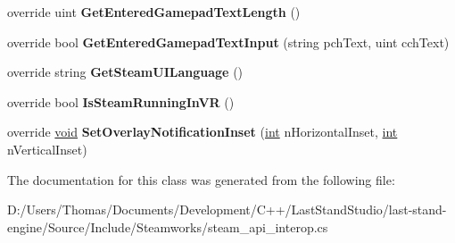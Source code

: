 \begin{DoxyCompactItemize}
\item 
\hypertarget{classValve_1_1Steamworks_1_1CSteamUtils_ab6822b494eec6c3917c4ce29c2763ef0}{}override uint {\bfseries Get\+Entered\+Gamepad\+Text\+Length} ()\label{classValve_1_1Steamworks_1_1CSteamUtils_ab6822b494eec6c3917c4ce29c2763ef0}

\item 
\hypertarget{classValve_1_1Steamworks_1_1CSteamUtils_aa99802aa51895b9343a1f068cb5695cb}{}override bool {\bfseries Get\+Entered\+Gamepad\+Text\+Input} (string pch\+Text, uint cch\+Text)\label{classValve_1_1Steamworks_1_1CSteamUtils_aa99802aa51895b9343a1f068cb5695cb}

\item 
\hypertarget{classValve_1_1Steamworks_1_1CSteamUtils_a2d7b8d89bb4150045d189a641a044fa5}{}override string {\bfseries Get\+Steam\+U\+I\+Language} ()\label{classValve_1_1Steamworks_1_1CSteamUtils_a2d7b8d89bb4150045d189a641a044fa5}

\item 
\hypertarget{classValve_1_1Steamworks_1_1CSteamUtils_a4b6487a9e80419629d25a6e880ebec4e}{}override bool {\bfseries Is\+Steam\+Running\+In\+V\+R} ()\label{classValve_1_1Steamworks_1_1CSteamUtils_a4b6487a9e80419629d25a6e880ebec4e}

\item 
\hypertarget{classValve_1_1Steamworks_1_1CSteamUtils_a67252ee53ad15ac69ad89dafbe1b7a2d}{}override \hyperlink{SDL__audio_8h_a52835ae37c4bb905b903cbaf5d04b05f}{void} {\bfseries Set\+Overlay\+Notification\+Inset} (\hyperlink{SDL__thread_8h_a6a64f9be4433e4de6e2f2f548cf3c08e}{int} n\+Horizontal\+Inset, \hyperlink{SDL__thread_8h_a6a64f9be4433e4de6e2f2f548cf3c08e}{int} n\+Vertical\+Inset)\label{classValve_1_1Steamworks_1_1CSteamUtils_a67252ee53ad15ac69ad89dafbe1b7a2d}

\end{DoxyCompactItemize}


The documentation for this class was generated from the following file\+:\begin{DoxyCompactItemize}
\item 
D\+:/\+Users/\+Thomas/\+Documents/\+Development/\+C++/\+Last\+Stand\+Studio/last-\/stand-\/engine/\+Source/\+Include/\+Steamworks/steam\+\_\+api\+\_\+interop.\+cs\end{DoxyCompactItemize}
